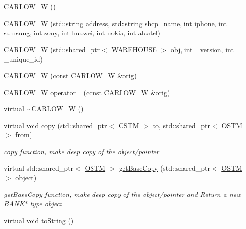\begin{DoxyCompactItemize}
\item 
\hyperlink{class_c_a_r_l_o_w___w_a8ae6ca6f4db7ea5240322fd27824c55a}{C\+A\+R\+L\+O\+W\+\_\+W} ()
\item 
\hyperlink{class_c_a_r_l_o_w___w_aa13cfb47255f935a3b27708b68e52129}{C\+A\+R\+L\+O\+W\+\_\+W} (std\+::string address, std\+::string shop\+\_\+name, int iphone, int samsung, int sony, int huawei, int nokia, int alcatel)
\item 
\hyperlink{class_c_a_r_l_o_w___w_ad3b772ca2d09eba4a273cb0c7cece747}{C\+A\+R\+L\+O\+W\+\_\+W} (std\+::shared\+\_\+ptr$<$ \hyperlink{class_w_a_r_e_h_o_u_s_e}{W\+A\+R\+E\+H\+O\+U\+SE} $>$ obj, int \+\_\+version, int \+\_\+unique\+\_\+id)
\item 
\hyperlink{class_c_a_r_l_o_w___w_a267a2792c59f475740a68953c8437205}{C\+A\+R\+L\+O\+W\+\_\+W} (const \hyperlink{class_c_a_r_l_o_w___w}{C\+A\+R\+L\+O\+W\+\_\+W} \&orig)
\item 
\hyperlink{class_c_a_r_l_o_w___w}{C\+A\+R\+L\+O\+W\+\_\+W} \hyperlink{class_c_a_r_l_o_w___w_a38c83795abf1751b3e122c74494f4586}{operator=} (const \hyperlink{class_c_a_r_l_o_w___w}{C\+A\+R\+L\+O\+W\+\_\+W} \&orig)
\item 
virtual \hyperlink{class_c_a_r_l_o_w___w_aa628d46e58dfd0517f24499eca88138b}{$\sim$\+C\+A\+R\+L\+O\+W\+\_\+W} ()
\item 
virtual void \hyperlink{class_c_a_r_l_o_w___w_ac91cb7cbae77752e334e273b97fb988b}{copy} (std\+::shared\+\_\+ptr$<$ \hyperlink{class_o_s_t_m}{O\+S\+TM} $>$ to, std\+::shared\+\_\+ptr$<$ \hyperlink{class_o_s_t_m}{O\+S\+TM} $>$ from)
\begin{DoxyCompactList}\small\item\em copy function, make deep copy of the object/pointer \end{DoxyCompactList}\item 
virtual std\+::shared\+\_\+ptr$<$ \hyperlink{class_o_s_t_m}{O\+S\+TM} $>$ \hyperlink{class_c_a_r_l_o_w___w_a1a76566c3a7c01cf469007741dac6b97}{get\+Base\+Copy} (std\+::shared\+\_\+ptr$<$ \hyperlink{class_o_s_t_m}{O\+S\+TM} $>$ object)
\begin{DoxyCompactList}\small\item\em get\+Base\+Copy function, make deep copy of the object/pointer and Return a new B\+A\+N\+K$\ast$ type object \end{DoxyCompactList}\item 
virtual void \hyperlink{class_c_a_r_l_o_w___w_a79e683650f861b59752fb027a5f16e5a}{to\+String} ()

\end{DoxyCompactItemize}
